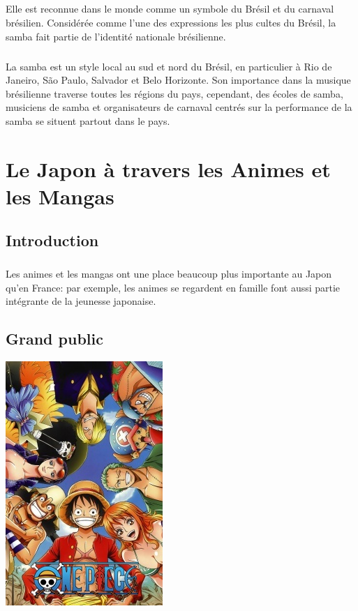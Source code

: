 \paragraph{} Elle est reconnue dans le monde comme un symbole du Brésil et du
carnaval brésilien. Considérée comme l'une des expressions les plus cultes du
Brésil, la samba fait partie de l'identité nationale brésilienne.

\paragraph{} La samba est un style local au sud et nord du Brésil, en
particulier à Rio de Janeiro, São Paulo, Salvador et Belo Horizonte. Son
importance dans la musique brésilienne traverse toutes les régions du pays,
cependant, des écoles de samba, musiciens de samba et organisateurs de carnaval
centrés sur la performance de la samba se situent partout dans le pays.

\chapter[Les Animes et les Mangas]{Le Japon à travers les Animes et les Mangas}

\section{Introduction}

\paragraph{} Les animes et les mangas ont une place beaucoup plus importante au
Japon qu'en France: par exemple, les animes se regardent en famille font aussi
partie intégrante de la jeunesse japonaise.

\section{Grand public}

\begin{center}
	\centering
	\includegraphics[scale=0.6]{OnePiece.jpg}
\end{center}

